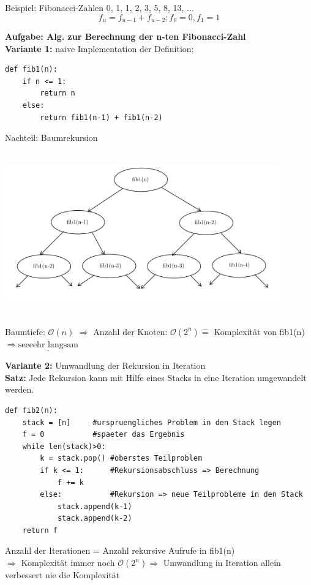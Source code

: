 \documentclass[11pt, fleqn]{scrreprt}
\newcommand{\bigO}[0]{\mathcal{O}}
\begin{document}
Beispiel: Fibonacci-Zahlen
0, 1, 1, 2, 3, 5, 8, 13, ...\\
\[f_u = f_{u-1} + f_{u-2}; f_0 = 0, f_1 = 1\]

\textbf{Aufgabe: Alg. zur Berechnung der n-ten Fibonacci-Zahl}\\

\textbf{Variante 1:} naive Implementation der Definition:
\begin{verbatim}
def fib1(n):
    if n <= 1:
        return n
    else:
        return fib1(n-1) + fib1(n-2)
\end{verbatim}
Nachteil: Baumrekursion\\
\begin{center}
\includegraphics[width=12cm,height=7cm,keepaspectratio]{./Pictures/Fibonacci.png}
\end{center}

Baumtiefe: $\bigO{}(n)$ $\Rightarrow$ Anzahl der Knoten: $\bigO{}(2^n) \widehat{=}$ Komplexität von fib1(n) $\Rightarrow \underline{\text{seeeehr langsam}}$

\textbf{Variante 2:} Umwandlung der Rekursion in Iteration\\

\textbf{Satz:} Jede Rekursion kann mit Hilfe eines Stacks in eine Iteration umgewandelt werden.
\begin{verbatim}
def fib2(n):
    stack = [n]     #urspruengliches Problem in den Stack legen
    f = 0           #spaeter das Ergebnis
    while len(stack)>0:
        k = stack.pop() #oberstes Teilproblem
        if k <= 1:      #Rekursionsabschluss => Berechnung
            f += k
        else:           #Rekursion => neue Teilprobleme in den Stack
            stack.append(k-1)
            stack.append(k-2)
    return f
\end{verbatim}

Anzahl der Iterationen = Anzahl rekursive Aufrufe in fib1(n)\\
$\Rightarrow$ Komplexität immer noch $\bigO{}(2^n) \Rightarrow$ Umwandlung in Iteration allein verbessert nie die Komplexität\\
\end{document}
